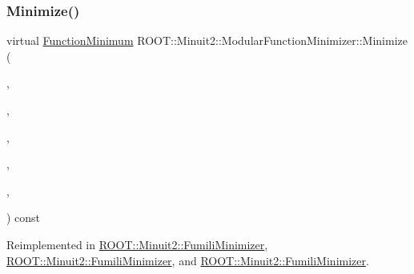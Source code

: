 \subsubsection{\texorpdfstring{Minimize()}{Minimize()}\hspace{0.1cm}{\footnotesize\ttfamily [32/33]}}
{\footnotesize\ttfamily virtual \mbox{\hyperlink{classROOT_1_1Minuit2_1_1FunctionMinimum}{Function\+Minimum}} R\+O\+O\+T\+::\+Minuit2\+::\+Modular\+Function\+Minimizer\+::\+Minimize (\begin{DoxyParamCaption}\item[{const \mbox{\hyperlink{classROOT_1_1Minuit2_1_1MnFcn}{Mn\+Fcn}} \&}]{,  }\item[{const \mbox{\hyperlink{classROOT_1_1Minuit2_1_1GradientCalculator}{Gradient\+Calculator}} \&}]{,  }\item[{const \mbox{\hyperlink{classROOT_1_1Minuit2_1_1MinimumSeed}{Minimum\+Seed}} \&}]{,  }\item[{const \mbox{\hyperlink{classROOT_1_1Minuit2_1_1MnStrategy}{Mn\+Strategy}} \&}]{,  }\item[{unsigned int}]{,  }\item[{double}]{ }\end{DoxyParamCaption}) const\hspace{0.3cm}{\ttfamily [virtual]}}



Reimplemented in \mbox{\hyperlink{classROOT_1_1Minuit2_1_1FumiliMinimizer_ace396e586a17ad934f18b32c8ddd054a}{R\+O\+O\+T\+::\+Minuit2\+::\+Fumili\+Minimizer}}, \mbox{\hyperlink{classROOT_1_1Minuit2_1_1FumiliMinimizer_ace396e586a17ad934f18b32c8ddd054a}{R\+O\+O\+T\+::\+Minuit2\+::\+Fumili\+Minimizer}}, and \mbox{\hyperlink{classROOT_1_1Minuit2_1_1FumiliMinimizer_ace396e586a17ad934f18b32c8ddd054a}{R\+O\+O\+T\+::\+Minuit2\+::\+Fumili\+Minimizer}}.

\mbox{\label{classROOT_1_1Minuit2_1_1ModularFunctionMinimizer_ad4852ac93fa43f2328b9857acc602296}} 
